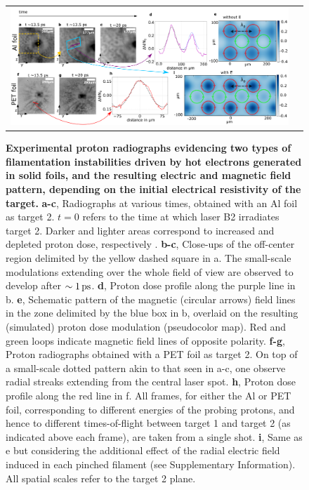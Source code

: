 \documentclass[aps,twocolumn,showpacs,superscriptaddress]{revtex4}
\begin{document}
\begin{figure}[tbh!]
\begin{tabular}{cc}
\includegraphics[scale = 0.6]{panel_v7_woE.png}
\end{tabular}
 \caption{
\textbf{Experimental proton radiographs evidencing two types of filamentation instabilities driven by hot electrons generated in solid foils, and the resulting electric and magnetic field pattern, depending on the initial electrical resistivity of the target.}
\textbf{a-c}, Radiographs at various times, obtained with an Al foil as target 2. $t=0$ refers to the time at which laser B2 irradiates target 2. Darker and lighter areas correspond to increased and depleted proton dose, respectively \cite{RSI_Albertazzi_2015}. 
\textbf{b-c}, Close-ups of the off-center region delimited by the yellow dashed square in a. The small-scale modulations extending over the whole field of view are observed to develop after $\sim 1\,\rm ps$.
\textbf{d}, Proton dose profile along the purple line in b.
\textbf{e}, Schematic pattern of the magnetic (circular arrows) field lines in the zone delimited by the blue box in b, overlaid on the resulting (simulated) proton dose modulation (pseudocolor map). Red and green loops indicate magnetic field lines of opposite polarity.
\textbf{f-g}, Proton radiographs obtained with a PET foil as target 2. 
On top of a small-scale dotted pattern akin to that seen in a-c, one observe radial streaks extending from the central laser spot. 
\textbf{h}, Proton dose profile along the red line in f.
All frames, for either the Al or PET foil, corresponding to different energies of the probing protons, and hence to different times-of-flight between target 1 and target 2 (as indicated above each frame), are taken from a single shot.
\textbf{i}, Same as e but considering the additional effect of the radial electric field induced in each pinched filament (see Supplementary Information).
All spatial scales refer to the target 2 plane.}
\label{fig:radio}
\end{figure}
\end{document}
